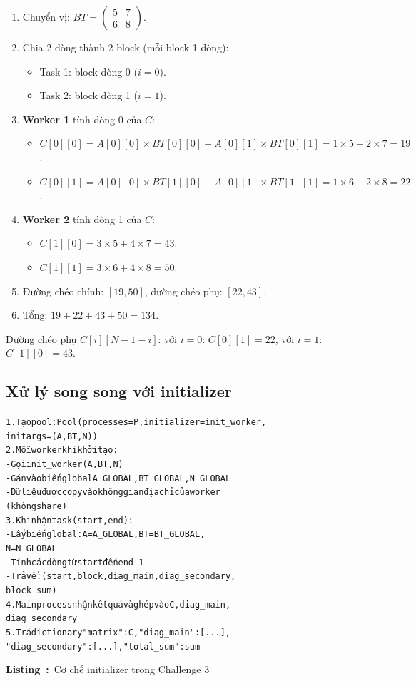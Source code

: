 \documentclass[12pt,a4paper]{article}
\newcounter{vietlisting}
\newenvironment{vietlisting}[1]{%
  \def\vietlistingcaption{#1}%
  \refstepcounter{vietlisting}%
  \begin{tcolorbox}[
    enhanced,
    breakable,
    colback=codebg,
    colframe=codeframe,
    boxrule=0.5pt,
    arc=1mm,
    left=6pt,
    right=6pt,
    top=6pt,
    bottom=4pt
  ]%
  \small\ttfamily\begin{alltt}
}{%
  \end{alltt}\normalfont
  \end{tcolorbox}%
  \begin{center}
    \small\textbf{Listing~\thevietlisting:}~\vietlistingcaption
  \end{center}
}
\begin{document}
\begin{enumerate}
  \item Chuyển vị: $BT = \begin{pmatrix}5 & 7\\ 6 & 8\end{pmatrix}$.
  \item Chia 2 dòng thành 2 block (mỗi block 1 dòng):
    \begin{itemize}
      \item Task 1: block dòng 0 ($i=0$).
      \item Task 2: block dòng 1 ($i=1$).
    \end{itemize}
  \item \textbf{Worker 1} tính dòng 0 của $C$:
    \begin{itemize}
      \item $C[0][0] = A[0][0]\times BT[0][0] + A[0][1]\times BT[0][1] = 1\times5 + 2\times7 = 19$.
      \item $C[0][1] = A[0][0]\times BT[1][0] + A[0][1]\times BT[1][1] = 1\times6 + 2\times8 = 22$.
    \end{itemize}
  \item \textbf{Worker 2} tính dòng 1 của $C$:
    \begin{itemize}
      \item $C[1][0] = 3\times5 + 4\times7 = 43$.
      \item $C[1][1] = 3\times6 + 4\times8 = 50$.
    \end{itemize}
  \item Đường chéo chính: $[19, 50]$, đường chéo phụ: $[22, 43]$.
  \item Tổng: $19 + 22 + 43 + 50 = 134$.
\end{enumerate}

Đường chéo phụ $C[i][N-1-i]$: với $i=0$: $C[0][1]=22$, với $i=1$: $C[1][0]=43$.

\subsection{Xử lý song song với initializer}

\begin{vietlisting}{Cơ chế initializer trong Challenge 3}
1. Tạo pool: Pool(processes=P, initializer=init_worker, 
initargs=(A, BT, N))
2. Mỗi worker khi khởi tạo:
   - Gọi init_worker(A, BT, N)
   - Gán vào biến global A_GLOBAL, BT_GLOBAL, N_GLOBAL
   - Dữ liệu được copy vào không gian địa chỉ của worker 
   (không share)
3. Khi nhận task (start, end):
   - Lấy biến global: A = A_GLOBAL, BT = BT_GLOBAL, 
   N = N_GLOBAL
   - Tính các dòng từ start đến end-1
   - Trả về: (start, block, diag_main, diag_secondary, 
   block_sum)
4. Main process nhận kết quả và ghép vào C, diag_main, 
diag_secondary
5. Trả dictionary {"matrix": C, "diag_main": [...], 
"diag_secondary": [...], "total_sum": sum}
\end{vietlisting}
\end{document}
